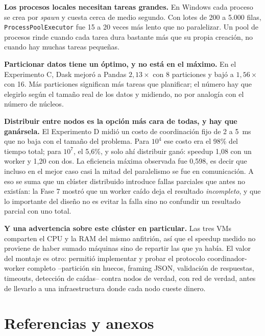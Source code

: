\documentclass[11pt]{article}
\begin{document}
\textbf{Los procesos locales necesitan tareas grandes.} En Windows cada proceso
se crea por \emph{spawn} y cuesta cerca de medio segundo. Con lotes de 200 a
5.000 filas, \texttt{ProcessPoolExecutor} fue 15 a 20 veces más lento que no
paralelizar. Un pool de procesos rinde cuando cada tarea dura bastante más que
su propia creación, no cuando hay muchas tareas pequeñas.

\textbf{Particionar datos tiene un óptimo, y no está en el máximo.} En el
Experimento C, Dask mejoró a Pandas $2,13\times$ con 8 particiones y bajó a
$1,56\times$ con 16. Más particiones significan más tareas que planificar;
el número hay que elegirlo según el tamaño real de los datos y midiendo, no por
analogía con el número de núcleos.

\textbf{Distribuir entre nodos es la opción más cara de todas, y hay que
ganársela.} El Experimento D midió un costo de coordinación fijo de 2 a 5~ms
que no baja con el tamaño del problema. Para $10^4$ ese costo era el 98\% del
tiempo total; para $10^7$, el 5,6\%, y solo ahí distribuir ganó: speedup 1,08
con un worker y 1,20 con dos. La eficiencia máxima observada fue 0,598, es
decir que incluso en el mejor caso casi la mitad del paralelismo se fue en
comunicación. A eso se suma que un clúster distribuido introduce fallas
parciales que antes no existían: la Fase 7 mostró que un worker caído deja el
resultado \emph{incompleto}, y que lo importante del diseño no es evitar la
falla sino no confundir un resultado parcial con uno total.

\textbf{Y una advertencia sobre este clúster en particular.} Las tres VMs
comparten el CPU y la RAM del mismo anfitrión, así que el speedup medido no
proviene de haber sumado máquinas sino de repartir las que ya había. El valor
del montaje es otro: permitió implementar y probar el protocolo
coordinador-worker completo --partición sin huecos, framing JSON, validación de
respuestas, timeouts, detección de caídas-- contra nodos de verdad, con red de
verdad, antes de llevarlo a una infraestructura donde cada nodo cueste dinero.

\section{Referencias y anexos}
\label{sec:referencias}
\end{document}
